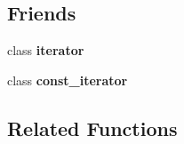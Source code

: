 \subsection*{\-Friends}
\begin{DoxyCompactItemize}
\item 
\hypertarget{classaed2_1_1map_a67171474c4da6cc8efe0c7fafefd2b2d}{class {\bfseries iterator}}\label{classaed2_1_1map_a67171474c4da6cc8efe0c7fafefd2b2d}

\item 
\hypertarget{classaed2_1_1map_ac220ce1c155db1ac44146c12d178056f}{class {\bfseries const\-\_\-iterator}}\label{classaed2_1_1map_ac220ce1c155db1ac44146c12d178056f}

\end{DoxyCompactItemize}
\subsection*{\-Related \-Functions}
